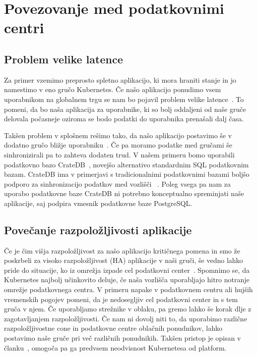\documentclass[a4paper, 12pt]{book}
\begin{document}
\chapter{Povezovanje med podatkovnimi centri}
\label{povezovanje-med-centri}
\section{Problem velike latence}
Za primer vzemimo preprosto spletno aplikacijo, ki mora hraniti stanje in jo namestimo v eno gručo Kubernetes.
Če našo aplikacijo ponudimo vsem uporabnikom na globalnem trgu se nam bo pojavil problem velike latence~\cite{minimizing-latency}.
To pomeni, da bo naša aplikacija za uporabnike, ki so bolj oddaljeni od naše gruče delovala počasneje oziroma se bodo podatki do uporabnika prenašali dalj časa.

Takšen problem v splošnem rešimo tako, da našo aplikacijo postavimo še v dodatno gručo bližje uporabniku~\cite{geo-instability}.
Če pa moramo podatke med gručami še sinhronizirali pa to zahteva dodaten trud.
V našem primeru bomo uporabili podatkovno bazo CrateDB~\cite{cratedb}, novejšo alternativo standardnim SQL podatkovnim bazam.
CrateDB ima v primerjavi s tradicionalnimi podatkovnimi bazami boljšo podporo za sinhronizacijo podatkov med vozlišči ~\cite{databases-comparison}.
Poleg vsega pa nam za uporabo podatkovne baze CrateDB ni potrebno konceptualno spreminjati naše aplikacije, saj podpira vmesnik podatkovne baze PostgreSQL.
\section{Povečanje razpoložljivosti aplikacije}
Če je čim višja razpoložljivost za našo aplikacijo kritičnega pomena in smo že poskrbeli za visoko razpoložljivost (HA) aplikacije v naši gruči, še vedno lahko pride do situacije, ko iz omrežja izpade cel podatkovni center~\cite{cloud-failures}.
Spomnimo se, da Kubernetes najbolj učinkovito deluje, če naša vozlišča uporabljajo hitro notranje omrežje podatkovnega centra.
V primeru napake v podatkovnem centru ali hujših vremenskih pogojev pomeni, da je nedosegljiv cel podatkovni center in s tem gruča v njem.
Če uporabljamo strežnike v oblaku, pa gremo lahko še korak dlje z zagotavljanjem razpoložljivosti.
Če nam ni dovolj niti to, da uporabimo različne razpoložljivostne cone in podatkovne centre oblačnih ponudnikov, lahko postavimo naše gruče pri več različnih ponudnikih.
Takšen pristop je opisan v članku~\cite{tosca-fed}, omogoča pa ga predvsem neodvisnost Kubernetesa od platform.
\end{document}
